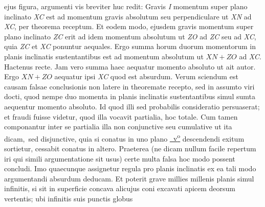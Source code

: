 ejus figura, argumenti vis breviter huc redit: Gravis \textit{I}
momentum super plano inclinato \textit{XC} est ad momentum
gravis absolutum seu perpendiculare ut \textit{XN} ad
\textit{XC}, per theorema receptum. Et eodem modo,
ejusdem gravis momentum super plano inclinato \textit{ZC}
erit ad idem momentum absolutum ut \textit{ZO} ad \textit{ZC}
seu ad \textit{XC}, quia \textit{ZC} et \textit{XC} ponuntur aequales.
Ergo summa horum duorum momentorum in planis
inclinatis sustentantibus est ad momentum
absolutum ut $XN+ZO$ ad \textit{XC}. Hactenus
recte. Jam vero summa haec aequatur momento
absoluto ut ait autor. Ergo $XN+ZO$ aequatur
ipsi \textit{XC} quod est absurdum. Verum
sciendum est causam falsae conclusionis non latere
in theoremate recepto, sed in assumto viri docti,
quod nempe duo momenta in planis inclinatis
sustentantibus simul sumta aequentur momento
absoluto. Id quod illi
sed probabilis consideratio persuaserat; et fraudi fuisse
videtur, quod illa vocavit partialia, hoc totale.
Cum tamen componantur inter se partialia illa
non conjunctive 
seu cumulative ut ita dicam\lbrack,\rbrack\
sed disjunctive, quia si conatus in uno plano
\href{\Scan{LH_35_05_28_008v}}%
{~v\textsuperscript{o}\rbrack} descendendi 
exitum sortietur, cessabit conatus
in altero. Praeterea (ne dicam nullum facile
repertum iri qui simili argumentatione sit
usus) certe multa falsa hoc modo possent
concludi. Imo quaecunque assignetur regula
pro planis inclinatis ex ea tali modo argumentandi
absurdum deducam. Et poterit
grave millies millenis planis simul
infinitis, si sit in superficie concava
alicujus coni excavati apicem deorsum
vertentis; ubi infinitis suis punctis globus
